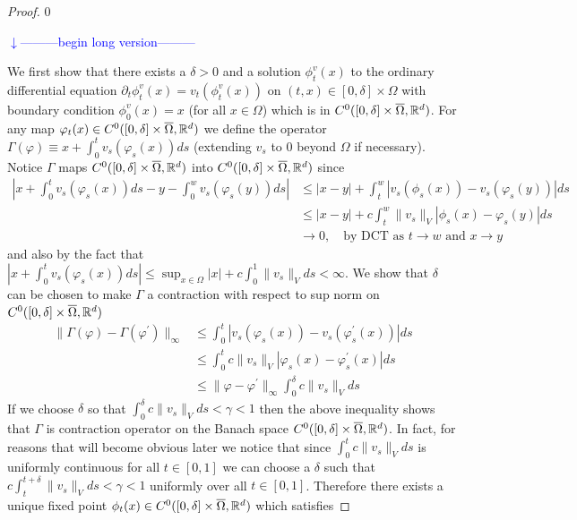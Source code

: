 \documentclass[noinfoline]{imsart}
\def\Ver{1}
\def\LongVer{0}
\begin{document}
\begin{proof}
%
\if\Ver\LongVer{
{\flushleft\textcolor{blue}{$\downarrow$---------begin long version---------}}\newline

We first show that there exists a $\delta>0$ and a solution $\phi^v_t(x)$   to the ordinary differential equation $ \partial_t \phi_t^v(x) = v_t(\phi_t^v(x)) $ on $(t,x)\in [0,\delta]\times\Omega$  with boundary condition $\phi_0^v(x)=x$ (for all $x\in \Omega$) which is in $C^0 ([0,\delta]\times \overline \Omega,\Bbb R^d)$.  For any map $\varphi_t(x)\in C^0 ([0,\delta]\times \overline \Omega,\Bbb R^d)$ we define the operator $\Gamma(\varphi)\equiv x + \int_0^t v_s(\varphi_s(x))ds $ (extending $v_s$ to $0$ beyond $\Omega$ if necessary). Notice  $\Gamma$ maps $C^0 ([0,\delta]\times \overline \Omega,\Bbb R^d)$ into $C^0 ([0,\delta]\times \overline \Omega,\Bbb R^d)$  since
\begin{align*}
|x + \int_0^t v_s(\varphi_s(x))ds  - y - \int_0^w v_s(\varphi_s(y))ds |
&\leq |x-y| + \int_t^w | v_s(\phi_s(x))-v_s(\varphi_s(y))  |ds \\
&\leq |x-y| + c\int_t^w \| v_s \|_V|\phi_s(x)-\varphi_s(y)  |ds \\
&\rightarrow 0, \quad\text{by DCT as $t\rightarrow w$ and $x\rightarrow y$}
\end{align*}
and also by the fact that $|x + \int_0^t v_s(\varphi_s(x))ds| \leq \sup_{x\in \Omega}|x| +  c\int_0^1 \|v_s\|_V ds <\infty$.
We show that $\delta$ can be chosen to make $\Gamma$ a contraction with respect to sup norm on $C^0 ([0,\delta]\times \overline \Omega,\Bbb R^d)$
\begin{align}
\|\Gamma(\varphi) - \Gamma(\varphi^\prime) \|_{\infty} &\leq \int_0^t |v_s(\varphi_s(x))-  v_s(\varphi^\prime_s(x)) |ds \nonumber\\
&\leq \int_0^t c\|v_s\|_V|\varphi_s(x)-  \varphi^\prime_s(x) |ds\nonumber \\
&\leq \|\varphi-  \varphi^\prime \|_\infty  \int_0^\delta c\|v_s\|_V ds \label{Contract}
\end{align}
If we choose $\delta$ so that $\int_0^\delta c\|v_s\|_V ds < \gamma<1$ then the above inequality shows that $\Gamma$ is contraction operator on the Banach space $C^0 ([0,\delta]\times \overline \Omega,\Bbb R^d)$. In fact, for reasons that will become obvious later we notice that since $\int_0^{t} c\| v_s \|_Vds$ is uniformly continuous for all $t\in[0,1]$ we can choose a $\delta$ such that $c\int_{t}^{t+\delta} \|v_s\|_V ds < \gamma<1$ uniformly over all $t\in [0,1]$. Therefore there exists a unique fixed point $\phi_t(x) \in C^0 ([0,\delta]\times \overline \Omega,\Bbb R^d)$ which satisfies
}
\end{proof}
\end{document}
